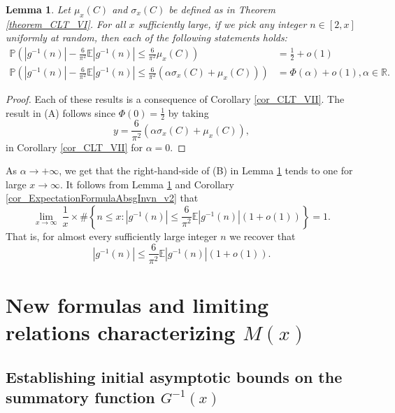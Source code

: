 \documentclass[11pt,reqno,a4letter]{article}
\numberwithin{figure}{section}
\numberwithin{table}{section}
\theoremstyle{plain}
\newtheorem{lemma}[theorem]{Lemma}
\numberwithin{theorem}{section}
\theoremstyle{definition}
\begin{document}
\begin{lemma} 
\label{lemma_ProbsOfAbsgInvnDist_v2} 
Let $\mu_x(C)$ and $\sigma_x(C)$ be defined as in 
Theorem \ref{theorem_CLT_VI}. 
For all $x$ sufficiently large, if we pick any integer $n \in [2, x]$ uniformly at random, then 
each of the following statements holds: 
\begin{align*} 
\tag{A}
     \mathbb{P}\left(|g^{-1}(n)| - \frac{6}{\pi^2} \mathbb{E}|g^{-1}(n)| \leq 
     \frac{6}{\pi^2} \mu_x(C) 
     \right) & = \frac{1}{2} + o(1) \\ 
\tag{B} 
\mathbb{P}\left(|g^{-1}(n)| - \frac{6}{\pi^2} \mathbb{E}|g^{-1}(n)| \leq 
     \frac{6}{\pi^2}\left(\alpha \sigma_x(C) + \mu_x(C)\right)
     \right) & = 
     \Phi\left(\alpha\right) + o(1), \alpha \in \mathbb{R}. 
\end{align*} 
\end{lemma} 
\begin{proof} 
Each of these results is a consequence of Corollary \ref{cor_CLT_VII}. 
The result in (A) follows since $\Phi(0) = \frac{1}{2}$ by taking 
     $$y = \frac{6}{\pi^2}\left(\alpha \sigma_x(C) + \mu_x(C)\right),$$ 
in Corollary \ref{cor_CLT_VII} 
for $\alpha = 0$. 
\end{proof} 

\label{remark_ProbsOfAbsgInvnDist_v3} 
As $\alpha \rightarrow +\infty$, 
we get that the right-hand-side of (B) in 
Lemma \ref{lemma_ProbsOfAbsgInvnDist_v2} 
tends to one for large $x \rightarrow \infty$. 
It follows from Lemma \ref{lemma_ProbsOfAbsgInvnDist_v2} and 
Corollary \ref{cor_ExpectationFormulaAbsgInvn_v2} that 
\[
\lim_{x \rightarrow \infty}\ \frac{1}{x} \times \#\left\{n \leq x: 
     |g^{-1}(n)| \leq \frac{6}{\pi^2} \mathbb{E}|g^{-1}(n)| (1+o(1))\right\} = 1. 
\]
That is, for almost every sufficiently large integer $n$ we recover that 
$$|g^{-1}(n)| \leq \frac{6}{\pi^2} \mathbb{E}|g^{-1}(n)| (1+o(1)).$$

\newpage 
\section{New formulas and limiting relations characterizing $M(x)$} 
\label{Section_KeyApplications} 

\subsection{Establishing initial asymptotic bounds on the summatory function $G^{-1}(x)$} 
\label{Section_ProofOfValidityOfAverageOrderLowerBounds} 
\end{document}
